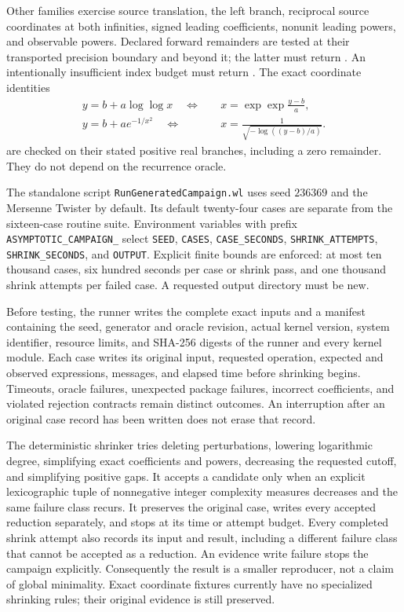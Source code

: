 Other families exercise source translation, the left branch, reciprocal
source coordinates at both infinities, signed leading coefficients, nonunit
leading powers, and observable powers. Declared forward remainders are
tested at their transported precision boundary and beyond it; the latter
must return . An intentionally
insufficient index budget must return .
The exact coordinate identities
\[
\begin{aligned}
 y=b+a\log\log x \quad\Longleftrightarrow\quad
 &x=\exp\exp\frac{y-b}{a},\\
 y=b+a e^{-1/x^2} \quad\Longleftrightarrow\quad
 &x=\frac1{\sqrt{-\log((y-b)/a)}}.
\end{aligned}
\]
are checked on their stated positive real branches, including a zero
remainder. They do not depend on the recurrence oracle.

The standalone script \texttt{RunGeneratedCampaign.wl} uses seed
$236369$ and the Mersenne Twister by default. Its default twenty-four
cases are separate from the sixteen-case routine suite. Environment
variables with prefix \texttt{ASYMPTOTIC\_CAMPAIGN\_} select
\texttt{SEED}, \texttt{CASES}, \texttt{CASE\_SECONDS},
\texttt{SHRINK\_ATTEMPTS}, \texttt{SHRINK\_SECONDS}, and
\texttt{OUTPUT}. Explicit finite bounds are enforced: at most ten thousand
cases, six hundred seconds per case or shrink pass, and one thousand shrink
attempts per failed case. A requested output directory must be new.

Before testing, the runner writes the complete exact inputs and a manifest
containing the seed, generator and oracle revision, actual kernel version,
system identifier, resource limits, and SHA-256 digests of the runner and
every kernel module. Each case writes its original input, requested operation,
expected and observed expressions, messages, and elapsed time before
shrinking begins. Timeouts, oracle failures, unexpected package failures,
incorrect coefficients, and violated rejection contracts remain distinct
outcomes. An interruption after an original case record has been written
does not erase that record.

The deterministic shrinker tries deleting perturbations, lowering logarithmic
degree, simplifying exact coefficients and powers, decreasing the requested
cutoff, and simplifying positive gaps. It accepts a candidate only when an
explicit lexicographic tuple of nonnegative integer complexity measures
decreases and the same failure class recurs. It preserves the original case,
writes every accepted reduction separately, and stops at its time or attempt
budget. Every completed shrink attempt also records its input and result,
including a different failure class that cannot be accepted as a reduction.
An evidence write failure stops the campaign explicitly. Consequently the
result is a smaller reproducer, not a claim of
global minimality. Exact coordinate fixtures currently have no specialized
shrinking rules; their original evidence is still preserved.

